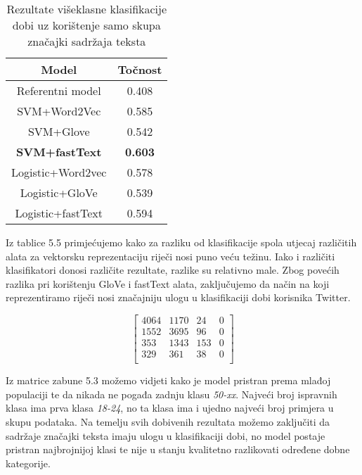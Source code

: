 \documentclass[times, utf8, zavrsni]{fer}
\begin{document}
\begin{table}[h!]
	\centering
	\begin{tabular}{||c|c||} 
		\hline
		Model & Točnost\\ [0.5ex] 
		\hline
		Referentni model & 0.408\\
		\hline
		SVM+Word2Vec & 0.585 \\
		\hline
		SVM+Glove & 0.542 \\
		\hline
		\textbf{SVM+fastText} & \textbf{0.603} \\
		\hline 
		Logistic+Word2vec & 0.578 \\ 
		\hline
		Logistic+GloVe & 0.539 \\ 
		\hline
		Logistic+fastText & 0.594 \\ 
		\hline
	\end{tabular}
	\caption{ Rezultate višeklasne klasifikacije dobi uz korištenje samo skupa značajki sadržaja teksta}
	\label{Table:1}
\end{table}

Iz tablice 5.5 primjećujemo kako za razliku od klasifikacije spola utjecaj različitih alata za vektorsku reprezentaciju riječi nosi puno veću težinu. Iako i različiti klasifikatori donosi različite rezultate, razlike su relativno male.
Zbog povećih razlika pri korištenju GloVe i fastText alata, zaključujemo da način na koji reprezentiramo riječi nosi značajniju ulogu u klasifikaciji dobi korisnika Twitter.\newline

\begin{equation}
\begin{bmatrix}
4064 & 1170 & 24 & 0 \\
1552 & 3695 & 96 & 0 \\
353 & 1343 & 153 & 0\\
329 & 361 & 38 & 0\\
\end{bmatrix}
\end{equation}\newline

Iz matrice zabune 5.3 možemo vidjeti kako je model pristran prema mlađoj populaciji te da nikada ne pogađa zadnju klasu \textit{50-xx}. Najveći broj ispravnih klasa ima prva klasa \textit{18-24}, no ta klasa ima i ujedno najveći broj primjera u skupu podataka. Na temelju svih dobivenih rezultata možemo zaključiti da sadržaje značajki teksta imaju ulogu u klasifikaciji dobi, no model postaje pristran najbrojnijoj klasi te nije u stanju kvalitetno razlikovati određene dobne kategorije.
\end{document}
